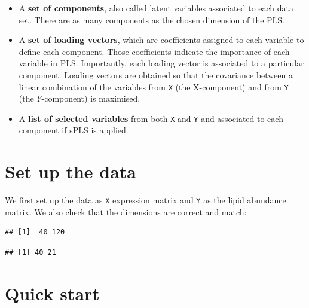 \documentclass[]{book}
\newenvironment{Shaded}{\begin{snugshade}}{\end{snugshade}}
\newcommand{\KeywordTok}[1]{\textcolor[rgb]{0.13,0.29,0.53}{\textbf{#1}}}
\newcommand{\NormalTok}[1]{#1}
\newcommand{\OperatorTok}[1]{\textcolor[rgb]{0.81,0.36,0.00}{\textbf{#1}}}
\newcommand{\StringTok}[1]{\textcolor[rgb]{0.31,0.60,0.02}{#1}}
\begin{document}
\begin{itemize}
\item
  A \textbf{set of components}, also called latent variables associated to each data set. There are as many components as the chosen dimension of the PLS.
\item
  A \textbf{set of loading vectors}, which are coefficients assigned to each variable to define each component. Those coefficients indicate the importance of each variable in PLS. Importantly, each loading vector is associated to a particular component. Loading vectors are obtained so that the covariance between a linear combination of the variables from \texttt{X} (the X-component) and from \texttt{Y} (the \(Y\)-component) is maximised.
\item
  A \textbf{list of selected variables} from both \texttt{X} and \texttt{Y} and associated to each component if sPLS is applied.
\end{itemize}

\hypertarget{set-up-the-data-1}{%
\section{Set up the data}\label{set-up-the-data-1}}

We first set up the data as \texttt{X} expression matrix and \texttt{Y} as the lipid abundance matrix. We also check that the dimensions are correct and match:

\begin{Shaded}
\end{Shaded}

\begin{verbatim}
## [1]  40 120
\end{verbatim}

\begin{verbatim}
## [1] 40 21
\end{verbatim}

\hypertarget{quick-start-2}{%
\section{Quick start}\label{quick-start-2}}
\end{document}
